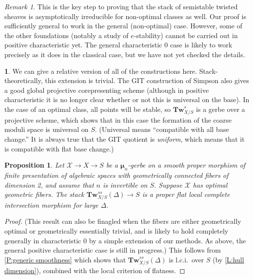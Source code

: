 \documentclass[11pt]{amsart}
\newcommand{\ms}[1]{\mathscr #1}
\newcommand{\m}{\boldsymbol{\mu}}
\renewcommand{\[}{[\!\hspace{0.03em}[}
\renewcommand{\]}{]\!\hspace{0.03em}]}
\renewcommand{\(}{(\!\hspace{0.03em}(}
\renewcommand{\)}{)\!\hspace{0.03em})}
\newcommand{\Tw}{\mathbf{Tw}}
\newtheorem{prop}[lem]{Proposition}
\theoremstyle{definition}
\newtheorem{para}[lem]{\indent}
\theoremstyle{remark}
\newtheorem{remark}[lem]{Remark}
\newenvironment{rem}{\begin{remark}}{\nolinebreak{\hfill $\blacklozenge$} \end{remark}}
\begin{document}
\begin{rem} This is the key step to proving that the stack 
of semistable twisted sheaves is asymptotically irreducible for 
non-optimal classes as well.  Our proof is sufficiently general to 
work in the general (non-optimal) case.  However, some of the other foundations 
(notably a study of $e$-stability) cannot be carried out in positive 
characteristic yet.  The general characteristic 0 case is likely to work 
precisely as it does in the classical case, but we have not yet 
checked the details.
\end{rem}

\begin{para} We can give a relative version of all of the 
constructions here.  Stack-theoretically, this extension is trivial.  
The GIT construction of Simpson also gives a good global projective 
corepresenting scheme (although in positive characteristic it is no longer 
clear whether or not this is universal on the base).  In the case of 
an optimal class, all points will be stable, so $\Tw^{s}_{X/S}$ is a 
gerbe over a projective scheme, which shows that in this case the 
formation of the coarse moduli space is universal on $S$.  (Universal 
means ``compatible with all base change.''  It is always true that the 
GIT quotient is \emph{uniform\/}, which means that it is compatible 
with flat base change.)
\end{para}

\begin{prop}\label{P:dedekind family} Let $\ms X\to X\to S$ be a 
$\m_{n}$-gerbe on a smooth proper morphism of finite presentation of 
algebraic spaces with geometrically connected fibers of dimension 2, and assume 
that $n$ is invertible on $S$.  Suppose $\ms X$ has optimal geometric fibers.  
The stack $\Tw^{ss}_{X/S}(\Delta)\to S$ is a proper flat local 
complete intersection morphism for large $\Delta$.
\end{prop}
\begin{proof} (This result can also be finagled when the fibers are 
either geometrically optimal or geometrically essentially trivial, 
and is likely to hold completely generally in characteristic 0 by a 
simple extension of our methods.  As above, the general positive 
characteristic case is still in progress.)  This follows from 
\ref{P:generic smoothness} which shows that $\Tw^{ss}_{X/S}(\Delta)$ is 
l.c.i.\ over $S$ (by \ref{L:hull dimension}), combined with the local criterion of flatness.
\end{proof}
\end{document}
